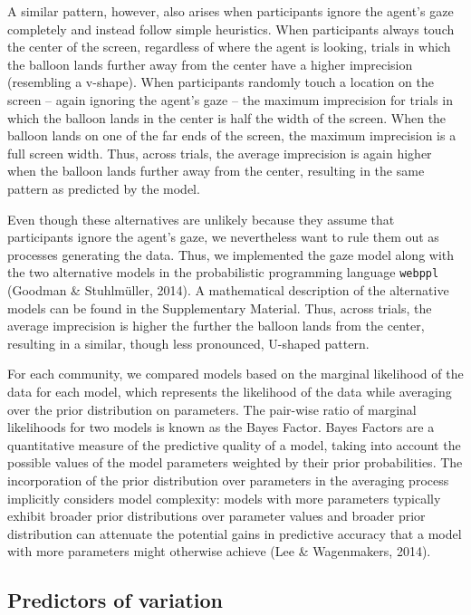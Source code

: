 \documentclass[
  man,floatsintext]{apa7}
\begin{document}
A similar pattern, however, also arises when participants ignore the agent's gaze completely and instead follow simple heuristics. When participants always touch the center of the screen, regardless of where the agent is looking, trials in which the balloon lands further away from the center have a higher imprecision (resembling a v-shape). When participants randomly touch a location on the screen -- again ignoring the agent's gaze -- the maximum imprecision for trials in which the balloon lands in the center is half the width of the screen. When the balloon lands on one of the far ends of the screen, the maximum imprecision is a full screen width. Thus, across trials, the average imprecision is again higher when the balloon lands further away from the center, resulting in the same pattern as predicted by the model.

Even though these alternatives are unlikely because they assume that participants ignore the agent's gaze, we nevertheless want to rule them out as processes generating the data. Thus, we implemented the gaze model along with the two alternative models in the probabilistic programming language \texttt{webppl} (Goodman \& Stuhlmüller, 2014). A mathematical description of the alternative models can be found in the Supplementary Material. Thus, across trials, the average imprecision is higher the further the balloon lands from the center, resulting in a similar, though less pronounced, U-shaped pattern.

For each community, we compared models based on the marginal likelihood of the data for each model, which represents the likelihood of the data while averaging over the prior distribution on parameters. The pair-wise ratio of marginal likelihoods for two models is known as the Bayes Factor. Bayes Factors are a quantitative measure of the predictive quality of a model, taking into account the possible values of the model parameters weighted by their prior probabilities. The incorporation of the prior distribution over parameters in the averaging process implicitly considers model complexity: models with more parameters typically exhibit broader prior distributions over parameter values and broader prior distribution can attenuate the potential gains in predictive accuracy that a model with more parameters might otherwise achieve (Lee \& Wagenmakers, 2014).

\subsection{Predictors of variation}\label{predictors-of-variation}
\end{document}
